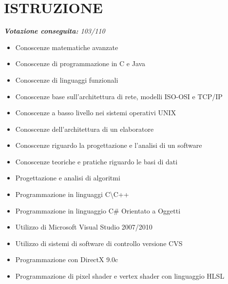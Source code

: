 \documentclass[11pt,a4paper,sans]{moderncv} %
\begin{document}
\section{ISTRUZIONE}
{
}


{
	\newline{}
	\textit{\textbf{Votazione conseguita:} 103/110}
}
{
	\begin{itemize}
		\item Conoscenze matematiche avanzate
		\item Conoscenze di programmazione in C e Java
		\item Conoscenze di linguaggi funzionali
		\item Conoscenze base sull'architettura di rete, modelli ISO-OSI e TCP/IP
		\item Conoscenze a basso livello nei sistemi operativi UNIX
		\item Conoscenze dell'architettura di un elaboratore
		\item Conoscenze riguardo la progettazione e l'analisi di un software
		\item Conoscenze teoriche e pratiche riguardo le basi di dati
		\item Progettazione e analisi di algoritmi
	\end{itemize}
}


{
	\begin{itemize}
		\item Programmazione in linguaggi C\textbackslash C++
		\item Programmazione in linguaggio C\# Orientato a Oggetti
		\item Utilizzo di Microsoft Visual Studio 2007/2010
		\item Utilizzo di sistemi di software di controllo versione CVS
		\item Programmazione con DirectX 9.0c
		\item Programmazione di pixel shader e vertex shader con linguaggio HLSL
	\end{itemize}
}
\end{document}
